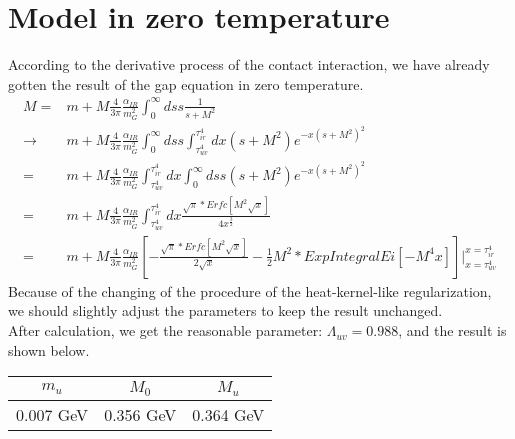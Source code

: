 \documentclass{article}
\begin{document}
\section{Model in zero temperature}
According to the derivative process of the contact interaction, we have already gotten the result of the gap equation in zero temperature.
\begin{equation}
    \begin{split}
        M=&m+M\frac{4}{3\pi}\frac{\alpha_{IR}}{m_G^2}\int_{0}^{\infty}ds s\frac{1}{s+M^2}\\
        \rightarrow&m+M\frac{4}{3\pi}\frac{\alpha_{IR}}{m_G^2}\int_{0}^{\infty}ds s\int_{\tau_{uv}^4}^{\tau_{ir}^4}dx(s+M^2)e^{-x(s+M^2)^2}\\
        =&m+M\frac{4}{3\pi}\frac{\alpha_{IR}}{m_G^2}\int_{\tau_{uv}^4}^{\tau_{ir}^4}dx\int_{0}^{\infty}ds s(s+M^2)e^{-x(s+M^2)^2}\\
        =&m+M\frac{4}{3\pi}\frac{\alpha_{IR}}{m_G^2}\int_{\tau_{uv}^4}^{\tau_{ir}^4}dx\frac{\sqrt{\pi}*Erfc[M^2\sqrt{x}]}{4x^{\frac{3}{2}}}\\
        =&m+M\frac{4}{3\pi}\frac{\alpha_{IR}}{m_G^2}[-\frac{\sqrt{\pi}*Erfc[M^2\sqrt{x}]}{2\sqrt{x}}-\frac{1}{2}M^2*ExpIntegralEi[-M^4x]]|_{x=\tau_{uv}^4}^{x=\tau_{ir}^4}
    \end{split}
\end{equation}
Because of the changing of the procedure of the heat-kernel-like regularization, we should slightly adjust the parameters to keep the result unchanged.\\
After calculation, we get the reasonable parameter: $\Lambda_{uv}=0.988$, and the result is shown below.
\begin{table}[H]
    \begin{center}
\begin{tabular}{|c|c|c|}
    \hline
    $m_u$ & $M_0$ & $M_u$ \\
    \hline
    0.007 GeV & 0.356 GeV&0.364 GeV \\
    \hline
\end{tabular}
\end{center}
\end{table}
\newpage
\end{document}
